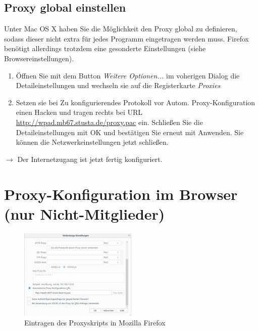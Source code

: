\documentclass[a4paper,12pt]{scrartcl}
\begin{document}
\subsection*{Proxy global einstellen}
Unter Mac OS X haben Sie die Möglichkeit den Proxy global zu definieren, sodass dieser nicht extra für jedes Programm eingetragen werden muss. Firefox benötigt allerdings trotzdem eine gesonderte Einstellungen (siehe Browsereinstellungen). %

\begin{enumerate}%
    \item Öffnen Sie mit dem Button \emph{Weitere Optionen...} im voherigen Dialog die Detaileinstellungen und wechseln sie auf die Registerkarte \emph{Proxies}
    \item Setzen sie bei Zu konfigurierendes Protokoll vor Autom. Proxy-Konfiguration einen Hacken und tragen rechts bei URL \url{http://wpad.mb67.stusta.de/proxy.pac} ein. Schließen Sie die Detaileinstellungen mit OK und bestätigen Sie erneut mit Anwenden. Sie können die Netzwerkeinstellungen jetzt schließen.
\end{enumerate}
$\rightarrow$ Der Internetzugang ist jetzt fertig konfiguriert.

\newpage

\section*{Proxy-Konfiguration im Browser (nur Nicht-Mitglieder)}
\label{Proxy}

\begin{figure}
	\vspace{-40pt}
	\begin{center}
		\includegraphics[width=0.5\textwidth,keepaspectratio]{Bilder/Proxy_Firefox_mb}
	\end{center}
	\caption{Eintragen des Proxyskripts in Mozilla Firefox}
\end{figure}
\end{document}
